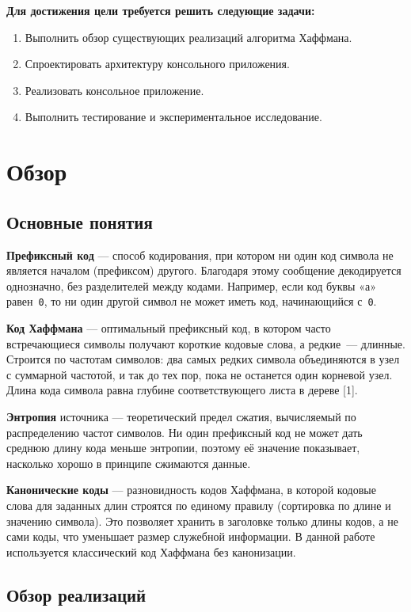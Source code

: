 \documentclass[a4paper]{article}
\begin{document}
\textbf{Для достижения цели требуется решить следующие задачи:}
\begin{enumerate}
    \item Выполнить обзор существующих реализаций алгоритма Хаффмана.
    \item Спроектировать архитектуру консольного приложения.
    \item Реализовать консольное приложение.
    \item Выполнить тестирование и экспериментальное исследование.
\end{enumerate}

\section{Обзор}

\subsection{Основные понятия}

\textbf{Префиксный код} — способ кодирования, при котором ни один код
символа не является началом (префиксом) другого. Благодаря этому
сообщение декодируется однозначно, без разделителей между кодами.
Например, если код буквы «а» равен~\texttt{0}, то ни один другой
символ не может иметь код, начинающийся с~\texttt{0}.

\textbf{Код Хаффмана} — оптимальный префиксный код, в котором
часто встречающиеся символы получают короткие кодовые слова,
а редкие~--- длинные. Строится по частотам символов: два самых
редких символа объединяются в узел с суммарной частотой, и так
до тех пор, пока не останется один корневой узел. Длина кода
символа равна глубине соответствующего листа в дереве [1].

\textbf{Энтропия} источника — теоретический предел сжатия,
вычисляемый по распределению частот символов. Ни один префиксный
код не может дать среднюю длину кода меньше энтропии, поэтому
её значение показывает, насколько хорошо в принципе сжимаются
данные.

\textbf{Канонические коды} — разновидность кодов Хаффмана,
в которой кодовые слова для заданных длин строятся по единому
правилу (сортировка по длине и значению символа). Это позволяет
хранить в заголовке только длины кодов, а не сами коды, что
уменьшает размер служебной информации. В данной работе
используется классический код Хаффмана без канонизации.

\subsection{Обзор реализаций}
\end{document}
